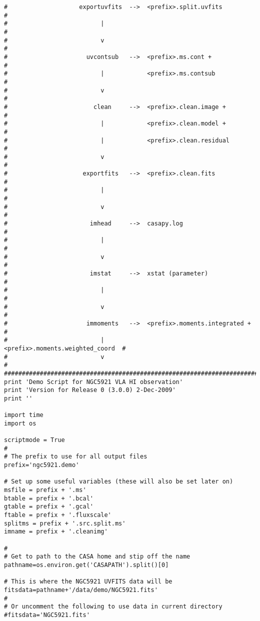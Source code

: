 \begin{verbatim}
#                    exportuvfits  -->  <prefix>.split.uvfits            #
#                          |                                             #
#                          v                                             #
#                      uvcontsub   -->  <prefix>.ms.cont +               #
#                          |            <prefix>.ms.contsub              #
#                          v                                             #
#                        clean     -->  <prefix>.clean.image +           #
#                          |            <prefix>.clean.model +           #
#                          |            <prefix>.clean.residual          #
#                          v                                             #
#                     exportfits   -->  <prefix>.clean.fits              #
#                          |                                             #
#                          v                                             #
#                       imhead     -->  casapy.log                       #
#                          |                                             #
#                          v                                             #
#                       imstat     -->  xstat (parameter)                #
#                          |                                             #
#                          v                                             #
#                      immoments   -->  <prefix>.moments.integrated +    #
#                          |            <prefix>.moments.weighted_coord  #
#                          v                                             #
##########################################################################
print 'Demo Script for NGC5921 VLA HI observation'
print 'Version for Release 0 (3.0.0) 2-Dec-2009'
print ''

import time
import os

scriptmode = True
# 
# The prefix to use for all output files
prefix='ngc5921.demo'

# Set up some useful variables (these will also be set later on)
msfile = prefix + '.ms'
btable = prefix + '.bcal'
gtable = prefix + '.gcal'
ftable = prefix + '.fluxscale'
splitms = prefix + '.src.split.ms'
imname = prefix + '.cleanimg'

#
# Get to path to the CASA home and stip off the name
pathname=os.environ.get('CASAPATH').split()[0]

# This is where the NGC5921 UVFITS data will be
fitsdata=pathname+'/data/demo/NGC5921.fits'
#
# Or uncomment the following to use data in current directory
#fitsdata='NGC5921.fits'


\end{verbatim}
